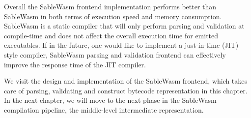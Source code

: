 Overall the SableWasm frontend implementation performs better than SableWasm in both terms of execution speed and memory consumption. SableWasm is a static compiler that will only perform parsing and validation at compile-time and does not affect the overall execution time for emitted executables. If in the future, one would like to implement a just-in-time (JIT) style compiler, SableWasm parsing and validation frontend can effectively improve the response time of the JIT compiler.

We visit the design and implementation of the SableWasm frontend, which takes care of parsing, validating and construct bytecode representation in this chapter. In the next chapter, we will move to the next phase in the SableWasm compilation pipeline, the middle-level intermediate representation.